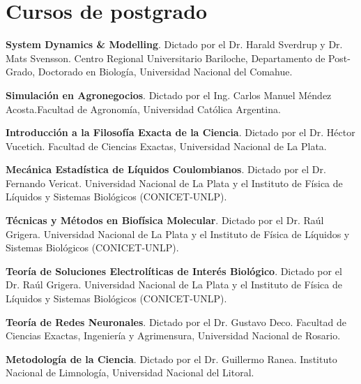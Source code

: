 \section{Cursos de postgrado}
 \textbf{System Dynamics \& Modelling}. Dictado por el Dr. Harald Sverdrup y Dr. Mats Svensson. Centro Regional Universitario Bariloche, Departamento de Post-Grado, Doctorado en Biología, Universidad Nacional del Comahue.
 
  \textbf{Simulación en Agronegocios}. Dictado por el Ing. Carlos Manuel Méndez Acosta.Facultad de Agronomía, Universidad Católica Argentina.
 
 \textbf{Introducción a la Filosofía Exacta de la Ciencia}. Dictado por el Dr. Héctor Vucetich. Facultad de Ciencias Exactas, Universidad Nacional de La Plata.
 
 \textbf{Mecánica Estadística de Líquidos Coulombianos}. Dictado por el Dr. Fernando Vericat. Universidad Nacional de La Plata  y el Instituto de Física de Líquidos y  Sistemas Biológicos (CONICET-UNLP).
 
 \textbf{Técnicas y Métodos en Biofísica Molecular}. Dictado por el Dr. Raúl Grigera. Universidad Nacional de La Plata  y el Instituto de Física de Líquidos y Sistemas Biológicos (CONICET-UNLP).
 
 \textbf{Teoría de Soluciones Electrolíticas de Interés Biológico}. Dictado por el Dr. Raúl Grigera. Universidad Nacional de La Plata  y el Instituto de Física de Líquidos y Sistemas Biológicos (CONICET-UNLP). 
 
 \textbf{Teoría de Redes Neuronales}. Dictado por el Dr. Gustavo Deco. Facultad de Ciencias Exactas, Ingeniería y Agrimensura, Universidad Nacional de Rosario.
 
 \textbf{Metodología de la Ciencia}. Dictado por el Dr. Guillermo Ranea. Instituto Nacional de Limnología, Universidad Nacional del Litoral.
